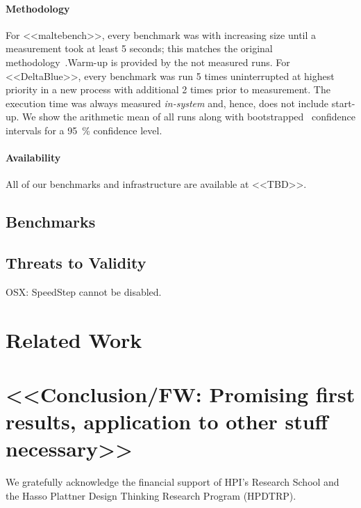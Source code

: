 \documentclass[preprint,english,10pt,nonatbib]{sigplanconf}
\begin{document}
\paragraph{Methodology} 
For <<maltebench>>, every benchmark was with increasing size until a
measurement took at least 5 seconds; this matches the original
methodology~\cite{appeltauer+:2009:comparison-context-oriented}.Warm-up is
provided by the not measured runs.
For <<DeltaBlue>>, every benchmark was run 5 times uninterrupted at highest
priority in a new process with additional 2 times prior to measurement.
The execution time was always measured \emph{in-system} and, hence, does not include start-up.
We show the arithmetic mean of all  runs along with
bootstrapped~\cite{davison+:1997:confidence-intervals} confidence intervals
for a \SI{95}{\percent} confidence level.


\paragraph{Availability}  All of our benchmarks and infrastructure
 are available at <<TBD>>.


\subsection{Benchmarks}


\subsection{Threats to Validity}

OSX: SpeedStep cannot be disabled.

\section{Related Work}

\section{<<Conclusion/FW: Promising first results, application to other stuff necessary>>}

\acks
We gratefully acknowledge the financial support of HPI's Research School and
the Hasso Plattner Design Thinking Research Program (HPDTRP).

\printbibliography

\end{document}
